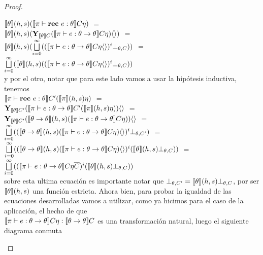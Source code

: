 \begin{proof}
\begin{itemize}
\begin{itemize}
$\llbracket \theta \rrbracket(h,s)(\llbracket \pi \vdash \textbf{rec} \ e : \theta \rrbracket C\eta)$ $=$\\
$\llbracket \theta \rrbracket(h,s)(
	\textbf{Y}_{\llbracket \theta \rrbracket C} 
		(\llbracket \pi \vdash e : \theta \rightarrow \theta \rrbracket C\eta) \langle  \rangle)$ $=$\\
$\llbracket \theta \rrbracket(h,s)(
\bigsqcup\limits^{\infty}_{i=0} (
	(\llbracket \pi \vdash e : \theta \rightarrow \theta \rrbracket C\eta\langle  \rangle)^i \bot_{\theta,C})
)$ $=$\\
$\bigsqcup\limits^{\infty}_{i=0}(
\llbracket \theta \rrbracket(h,s)(
	(\llbracket \pi \vdash e : \theta \rightarrow \theta \rrbracket C\eta\langle  \rangle)^i \bot_{\theta,C})
)$\\

y por el otro, notar que para este lado vamos a usar la hip\'otesis inductiva, tenemos\\

$\llbracket \pi \vdash \textbf{rec} \ e : \theta \rrbracket C'(\llbracket \pi \rrbracket(h,s)\eta)$ $=$ \\
$\textbf{Y}_{\llbracket \theta \rrbracket C'}(
\llbracket \pi \vdash e : \theta \rightarrow \theta \rrbracket C'(\llbracket \pi \rrbracket(h,s)\eta)
)\langle  \rangle$ $=$\\
$\textbf{Y}_{\llbracket \theta \rrbracket C'}(
\llbracket \theta \rightarrow \theta \rrbracket(h,s) 
	(\llbracket \pi \vdash e : \theta \rightarrow \theta \rrbracket C\eta)
)\langle  \rangle$ $=$\\
$\bigsqcup\limits^{\infty}_{i=0}(
(\llbracket \theta \rightarrow \theta \rrbracket(h,s) 
	(\llbracket \pi \vdash e : \theta \rightarrow \theta \rrbracket C\eta)\langle  \rangle)^i \bot_{\theta,C'}
)$ $=$\\
$\bigsqcup\limits^{\infty}_{i=0}(
(\llbracket \theta \rightarrow \theta \rrbracket(h,s) 
	(\llbracket \pi \vdash e : \theta \rightarrow \theta \rrbracket C\eta)\langle  \rangle)^i 
				(\llbracket \theta \rrbracket(h,s)\bot_{\theta,C})
)$ $=$\\
$\bigsqcup\limits^{\infty}_{i=0}(
(\llbracket \pi \vdash e : \theta \rightarrow \theta \rrbracket C\eta\overline{C})^i 
				(\llbracket \theta \rrbracket(h,s)\bot_{\theta,C})
)$\\

sobre esta ultima ecuaci\'on es importante notar que 
$\bot_{\theta,C'} = \llbracket \theta \rrbracket(h,s) \bot_{\theta,C}$, por ser $\llbracket \theta \rrbracket(h,s)$
una funci\'on estricta. Ahora bien, para probar la igualdad de las ecuaciones desarrolladas
vamos a utilizar, como ya hicimos para el caso de la aplicaci\'on, el hecho de que\\
$\llbracket \pi \vdash e : \theta \rightarrow \theta \rrbracket C\eta : 
\llbracket \theta \rightarrow \theta \rrbracket C$ es una transformaci\'on natural, luego el siguiente
diagrama conmuta


\end{itemize}
\end{itemize}
\end{proof}
